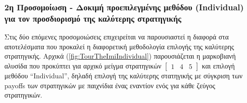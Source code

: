 \documentclass[12pt]{article}
\begin{document}
\subsubsection{2η Προσομοίωση - Δοκιμή προεπιλεγμένης μεθόδου (Individual) για τον προσδιορισμό της καλύτερης στρατηγικής}
Στις δύο επόμενες προσομοιώσεις επιχειρείται να παρουσιαστεί η διαφορά στα αποτελέσματα που προκαλεί η διαφορετική μεθοδολογία επιλογής της καλύτερης στρατηγικής. Αρχικά (\ref{fig:TourTheImiIndividual}) παρουσιάζεται η μαρκοβιανή αλυσίδα που προκύπτει για αρχικό μείγμα στρατηγικών $\begin{bmatrix}1&4&5\end{bmatrix}$ και επιλογή μεθόδου ``Individual'', δηλαδή επιλογή της καλύτερης στατηγικής με σύγκριση των payoffs των στρατηγικών με παιχνίδια ένας εναντίον ενός για κάθε ζεύγος στρατηγικών.
\end{document}
